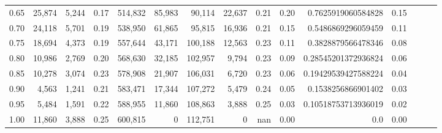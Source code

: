 \begin{tabular}{rrrrrrrrrrrrrrr}
0.65 &  25,874 &   5,244 &  0.17 &  514,832 &   85,983 &   90,114 &   22,637 &  0.21 &  0.20 &   0.7625919060584828 &      0.15 \\
0.70 &  24,118 &   5,701 &  0.19 &  538,950 &   61,865 &   95,815 &   16,936 &  0.21 &  0.15 &   0.5486869296059459 &      0.11 \\
0.75 &  18,694 &   4,373 &  0.19 &  557,644 &   43,171 &  100,188 &   12,563 &  0.23 &  0.11 &   0.3828879566478346 &      0.08 \\
0.80 &  10,986 &   2,769 &  0.20 &  568,630 &   32,185 &  102,957 &    9,794 &  0.23 &  0.09 &  0.28545201372936824 &      0.06 \\
0.85 &  10,278 &   3,074 &  0.23 &  578,908 &   21,907 &  106,031 &    6,720 &  0.23 &  0.06 &  0.19429539427588224 &      0.04 \\
0.90 &   4,563 &   1,241 &  0.21 &  583,471 &   17,344 &  107,272 &    5,479 &  0.24 &  0.05 &   0.1538256866901402 &      0.03 \\
0.95 &   5,484 &   1,591 &  0.22 &  588,955 &   11,860 &  108,863 &    3,888 &  0.25 &  0.03 &  0.10518753713936019 &      0.02 \\
1.00 &  11,860 &   3,888 &  0.25 &  600,815 &        0 &  112,751 &        0 &   nan &  0.00 &                  0.0 &      0.00 \\
\bottomrule
\end{tabular}
